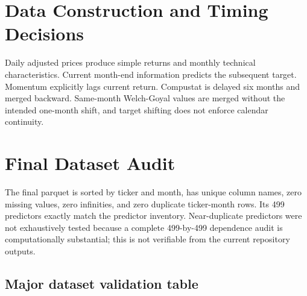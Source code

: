 \documentclass[
  11pt,
  a4paper]{article}
\begin{document}
\section{Data Construction and Timing Decisions}\label{sec-07}

Daily adjusted prices produce simple returns and monthly technical
characteristics. Current month-end information predicts the subsequent
target. Momentum explicitly lags current return. Compustat is delayed
six months and merged backward. Same-month Welch-Goyal values are merged
without the intended one-month shift, and target shifting does not
enforce calendar continuity.

\section{Final Dataset Audit}\label{sec-08}

The final parquet is sorted by ticker and month, has unique column
names, zero missing values, zero infinities, and zero duplicate
ticker-month rows. Its 499 predictors exactly match the predictor
inventory. Near-duplicate predictors were not exhaustively tested
because a complete 499-by-499 dependence audit is computationally
substantial; this is not verifiable from the current repository outputs.

\subsection{Major dataset validation table}\label{sec-dataset-table}
\end{document}
